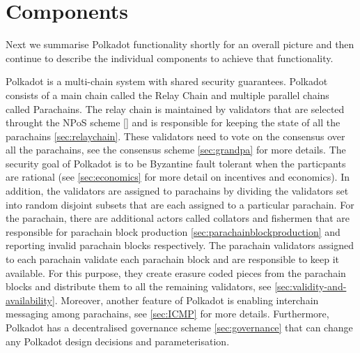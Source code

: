 \section{Components}\label{sec:components}
Next we summarise Polkadot functionality shortly for an overall picture and then continue to describe the individual components to achieve that functionality.

Polkadot is a multi-chain system with shared security guarantees. Polkadot consists of a main chain called the Relay Chain and multiple parallel chains
called Parachains. The relay chain is maintained by validators that are selected throught the NPoS scheme \ref{} and is responsible for keeping the state of all the parachains \ref{sec:relaychain}.
These validators need to vote on the consensus over all the parachains, see the consensus scheme \ref{sec:grandpa} for more details.
The security goal of Polkadot is to be Byzantine fault tolerant when the particpants are rational (see \ref{sec:economics} for more detail on incentives and economics).
In addition, the validators are assigned to parachains by dividing the validators set into random disjoint subsets that are each assigned to a particular parachain.
For the parachain, there are additional actors called collators and fishermen that are responsible for parachain block production \ref{sec:parachainblockproduction} and reporting invalid parachain blocks respectively.
The parachain validators assigned to each parachain validate each parachain block and are responsible to keep it available. For this purpose, they create erasure coded pieces from the parachain blocks and distribute
them to all the remaining validators, see \ref{sec:validity-and-availability}. Moreover, another feature of Polkadot is enabling interchain messaging among parachains, see \ref{sec:ICMP} for more details.
Furthermore, Polkadot has a decentralised governance scheme \ref{sec:governance} that can change any Polkadot design decisions and parameterisation.









